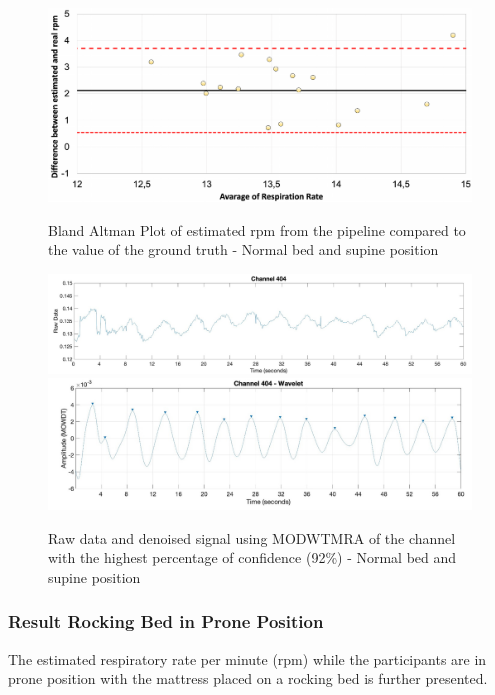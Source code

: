 \begin{figure}[p]
  \centering
  \includegraphics[width=\textwidth]{img/balnd1.pdf}

  \caption{Bland Altman Plot of estimated rpm from the pipeline compared to the value of the ground truth - Normal bed and supine position}
  \label{fig:baln1}
  \vspace{1.5cm}
  \includegraphics[width=\textwidth]{img/404.jpg}
  \includegraphics[width=\textwidth]{img/404_wave.jpg}
\caption{Raw data and denoised signal using MODWTMRA of the channel with the highest percentage of confidence (92\%) - Normal bed and supine position}
  \label{fig:rec}
\end{figure}

\clearpage
\subsubsection{Result Rocking Bed in Prone Position}  %

The estimated respiratory rate per minute (rpm) while the participants are in prone position with the mattress placed on a rocking bed is further presented. 

